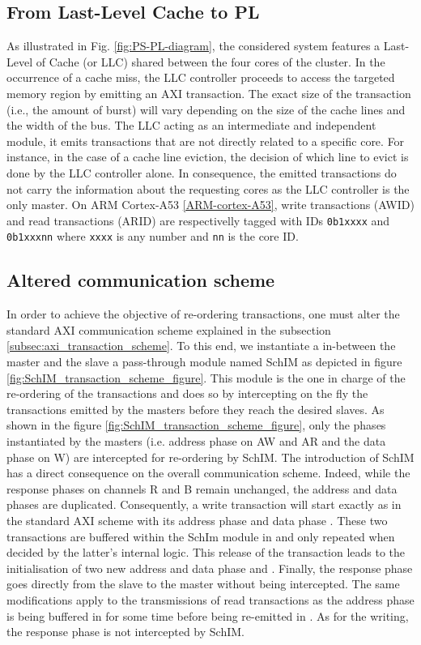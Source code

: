 \subsection{From Last-Level Cache to PL}
As illustrated in Fig. \ref{fig:PS-PL-diagram}, the considered system
features a Last-Level of Cache (or LLC) shared between the four cores
of the cluster. In the occurrence of a cache miss, the LLC controller
proceeds to access the targeted memory region by emitting an AXI
transaction. The exact size of the transaction (i.e., the amount of
burst) will vary depending on the size of the cache lines and the
width of the bus. The LLC acting as an intermediate and independent
module, it emits transactions that are not directly related to a
specific core. For instance, in the case of a cache line eviction, the
decision of which line to evict is done by the LLC controller
alone. In consequence, the emitted transactions do not carry the
information about the requesting cores as the LLC controller is the
only master. On ARM Cortex-A53 \ref{ARM-cortex-A53}, write
transactions (AWID) and read transactions (ARID) are respectivelly
tagged with IDs \verb|0b1xxxx| and \verb|0b1xxxnn| where \verb|xxxx|
is any number and \verb|nn| is the core ID.

\subsection{Altered communication scheme}
\label{subsec:communication-scheme}

In order to achieve the objective of re-ordering transactions, one
must alter the standard AXI communication scheme explained in the
subsection \ref{subsec:axi_transaction_scheme}.  To this end, we
instantiate a in-between the master and the slave a pass-through
module named SchIM as depicted in figure
\ref{fig:SchIM_transaction_scheme_figure}.  This module is the one in
charge of the re-ordering of the transactions and does so by
intercepting on the fly the transactions emitted by the masters before
they reach the desired slaves.  As shown in the figure
\ref{fig:SchIM_transaction_scheme_figure}, only the phases
instantiated by the masters (i.e. address phase on AW and AR and the
data phase on W) are intercepted for re-ordering by SchIM.  The
introduction of SchIM has a direct consequence on the overall
communication scheme. Indeed, while the response phases on channels R
and B remain unchanged, the address and data phases are duplicated.
Consequently, a write transaction will start exactly as in the
standard AXI scheme with its address phase  and data phase
.  These two transactions are buffered within the SchIm
module in  and only repeated when decided by the latter's
internal logic.  This release of the transaction leads to the
initialisation of two new address and data phase  and
.  Finally, the response phase  goes directly
from the slave to the master without being intercepted.  The same
modifications apply to the transmissions of read transactions as the
address phase  is being buffered in  for some
time before being re-emitted in .  As for the writing, the
response phase  is not intercepted by SchIM.

